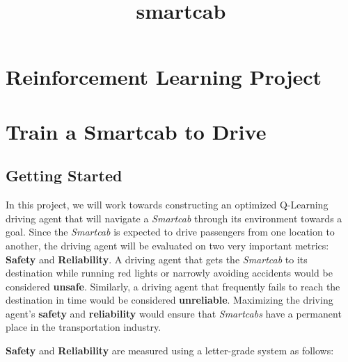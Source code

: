 \documentclass[11pt]{article}
\title{smartcab}
\begin{document}
    
    
    \maketitle
    
    

    
    \hypertarget{reinforcement-learning-project}{%
\section{Reinforcement Learning
Project}\label{reinforcement-learning-project}}

\hypertarget{train-a-smartcab-to-drive}{%
\section{Train a Smartcab to Drive}\label{train-a-smartcab-to-drive}}

    \hypertarget{getting-started}{%
\subsection{Getting Started}\label{getting-started}}

In this project, we will work towards constructing an optimized
Q-Learning driving agent that will navigate a \emph{Smartcab} through
its environment towards a goal. Since the \emph{Smartcab} is expected to
drive passengers from one location to another, the driving agent will be
evaluated on two very important metrics: \textbf{Safety} and
\textbf{Reliability}. A driving agent that gets the \emph{Smartcab} to
its destination while running red lights or narrowly avoiding accidents
would be considered \textbf{unsafe}. Similarly, a driving agent that
frequently fails to reach the destination in time would be considered
\textbf{unreliable}. Maximizing the driving agent's \textbf{safety} and
\textbf{reliability} would ensure that \emph{Smartcabs} have a permanent
place in the transportation industry.

\textbf{Safety} and \textbf{Reliability} are measured using a
letter-grade system as follows:
\end{document}
